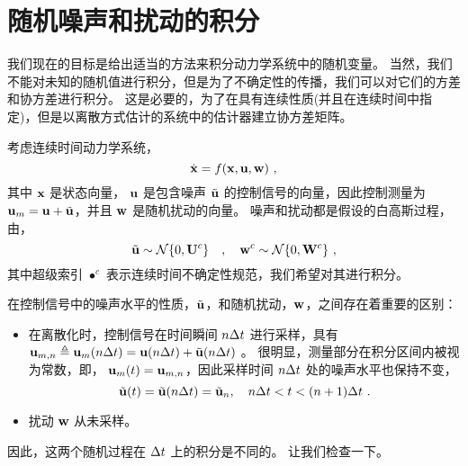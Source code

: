 
\section{随机噪声和扰动的积分}
\label{sec:IntNoise}

我们现在的目标是给出适当的方法来积分动力学系统中的随机变量。 
当然，我们不能对未知的随机值进行积分，但是为了不确定性的传播，我们可以对它们的方差和协方差进行积分。 
这是必要的，为了在具有连续性质(并且在连续时间中指定)，但是以离散方式估计的系统中的估计器建立协方差矩阵。

考虑连续时间动力学系统，
%
\begin{equation}
\dot{{\bf x}} = f({\bf x},{\bf u},{\bf w})~,
\label{equ:contSysWithNoise}
\end{equation}
%
其中 ${\bf x}$ 是状态向量， ${\bf u}$ 是包含噪声 $\tilde{{\bf u}}$ 的控制信号的向量，因此控制测量为 ${\bf u}_m={\bf u}+\tilde{{\bf u}}$，并且 ${\bf w}$ 是随机扰动的向量。 
噪声和扰动都是假设的白高斯过程，由，
%
\begin{equation}
\tilde{{\bf u}} \sim \mathcal{N}\{0,{\bf U}^c\} \quad , \quad {\bf w}^c\sim\mathcal{N}\{0,{\bf W}^c\}~,
\end{equation}
%
其中超级索引 $\bullet^c$ 表示连续时间不确定性规范，我们希望对其进行积分。

在控制信号中的噪声水平的性质，$\tilde{{\bf u}}$，和随机扰动，${\bf w}$，之间存在着重要的区别：
%
\begin{itemize}
\item 
在离散化时，控制信号在时间瞬间 $n\Delta t$ 进行采样，具有 ${\bf u}_{m,n}\triangleq{\bf u}_m(n\Delta t)={\bf u}(n\Delta t)+\tilde{{\bf u}}(n\Delta t)$ 。
很明显，测量部分在积分区间内被视为常数，即， ${\bf u}_m(t)={\bf u}_{m,n}$，因此采样时间 $n\Delta t$ 处的噪声水平也保持不变，
%
\begin{equation}
\tilde{{\bf u}}(t)=\tilde{{\bf u}}(n\Delta t) = \tilde{{\bf u}}_n, \quad n\Delta t<t<(n+1)\Delta t~. \label{equ:uint}
\end{equation}
%
\item  
扰动 ${\bf w}$ 从未采样。 

\end{itemize}
%


因此，这两个随机过程在 $\Delta t$ 上的积分是不同的。 
让我们检查一下。 


